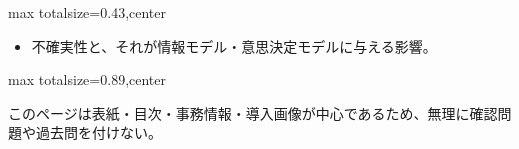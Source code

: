 \clearpage
{}
\begin{minipage}[t]{0.405\textwidth}
\begin{adjustbox}{max totalsize={\textwidth}{0.43\textheight},center}
\begin{minipage}{\textwidth}\scriptsize
{}\begin{itemize}
\item 不確実性と、それが情報モデル・意思決定モデルに与える影響。
\end{itemize}
\end{minipage}
\end{adjustbox}
\end{minipage}\hfill
\begin{minipage}[t]{0.58\textwidth}
\begin{adjustbox}{max totalsize={\textwidth}{0.89\textheight},center}
\begin{minipage}{\textwidth}\scriptsize
{}このページは表紙・目次・事務情報・導入画像が中心であるため、無理に確認問題や過去問を付けない。
\end{minipage}
\end{adjustbox}
\end{minipage}

